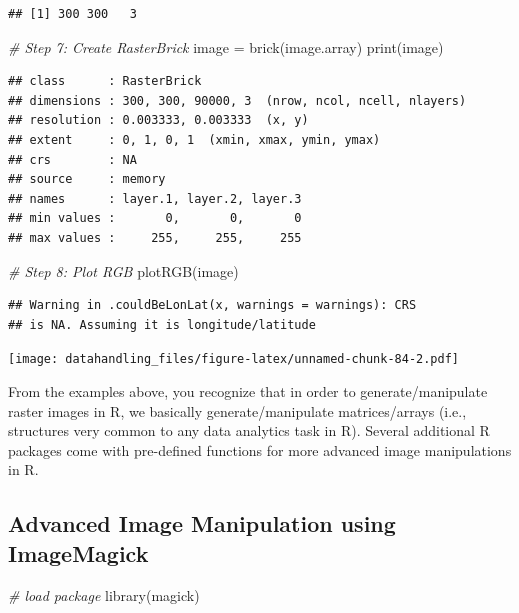 \documentclass[
  12pt,
]{style/krantz}
\newenvironment{Shaded}{\begin{snugshade}}{\end{snugshade}}
\newcommand{\CommentTok}[1]{\textcolor[rgb]{0.56,0.35,0.01}{\textit{#1}}}
\newcommand{\FunctionTok}[1]{\textcolor[rgb]{0.00,0.00,0.00}{#1}}
\newcommand{\NormalTok}[1]{#1}
\newcommand{\OtherTok}[1]{\textcolor[rgb]{0.56,0.35,0.01}{#1}}
\begin{document}
\begin{verbatim}
## [1] 300 300   3
\end{verbatim}

\begin{Shaded}
\begin{Highlighting}[]
\CommentTok{\# Step 7: Create RasterBrick}
\NormalTok{image }\OtherTok{=} \FunctionTok{brick}\NormalTok{(image.array)}
\FunctionTok{print}\NormalTok{(image)}
\end{Highlighting}
\end{Shaded}

\begin{verbatim}
## class      : RasterBrick 
## dimensions : 300, 300, 90000, 3  (nrow, ncol, ncell, nlayers)
## resolution : 0.003333, 0.003333  (x, y)
## extent     : 0, 1, 0, 1  (xmin, xmax, ymin, ymax)
## crs        : NA 
## source     : memory
## names      : layer.1, layer.2, layer.3 
## min values :       0,       0,       0 
## max values :     255,     255,     255
\end{verbatim}

\begin{Shaded}
\begin{Highlighting}[]
\CommentTok{\# Step 8: Plot RGB}
\FunctionTok{plotRGB}\NormalTok{(image)}
\end{Highlighting}
\end{Shaded}

\begin{verbatim}
## Warning in .couldBeLonLat(x, warnings = warnings): CRS
## is NA. Assuming it is longitude/latitude
\end{verbatim}

\texttt{[image: datahandling\_files/figure-latex/unnamed-chunk-84-2.pdf]}

From the examples above, you recognize that in order to generate/manipulate raster images in R, we basically generate/manipulate matrices/arrays (i.e., structures very common to any data analytics task in R). Several additional R packages come with pre-defined functions for more advanced image manipulations in R.

\hypertarget{advanced-image-manipulation-using-imagemagick}{%
\subsection{Advanced Image Manipulation using ImageMagick}\label{advanced-image-manipulation-using-imagemagick}}

\begin{Shaded}
\begin{Highlighting}[]
\CommentTok{\# load package}
\FunctionTok{library}\NormalTok{(magick)}
\end{Highlighting}
\end{Shaded}
\end{document}
